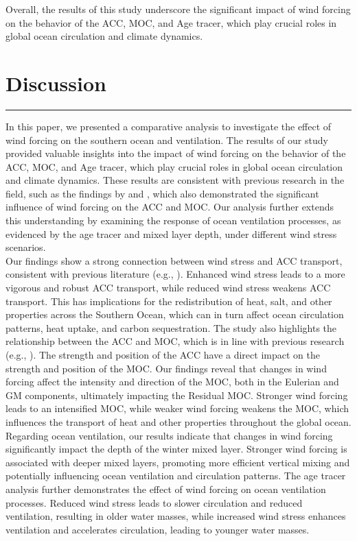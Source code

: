 \documentclass[12pt]{article}
\begin{document}
\noindent Overall, the results of this study underscore the significant impact of wind forcing on the behavior of the ACC, MOC, and Age tracer, which play crucial roles in global ocean circulation and climate dynamics.



\newpage
\section{Discussion}
\rule{\textwidth}{0.4pt}
In this paper, we presented a comparative analysis to investigate the effect of wind forcing on the southern ocean and ventilation.  The results of our study provided valuable insights into the impact of wind forcing on the behavior of the ACC, MOC, and Age tracer, which play crucial roles in global ocean circulation and climate dynamics. These results are consistent with previous research in the field, such as the findings by \cite{meredith2006circumpolar} and \cite{boning2008response}, which also demonstrated the significant influence of wind forcing on the ACC and MOC. Our analysis further extends this understanding by examining the response of ocean ventilation processes, as evidenced by the age tracer and mixed layer depth, under different wind stress scenarios.\\


\noindent Our findings show a strong connection between wind stress and ACC transport, consistent with previous literature (e.g., \citealp{boning2008response}). Enhanced wind stress leads to a more vigorous and robust ACC transport, while reduced wind stress weakens ACC transport. This has implications for the redistribution of heat, salt, and other properties across the Southern Ocean, which can in turn affect ocean circulation patterns, heat uptake, and carbon sequestration. The study also highlights the relationship between the ACC and MOC, which is in line with previous research (e.g., \citealp{marshall2012closure}). The strength and position of the ACC have a direct impact on the strength and position of the MOC. Our findings reveal that changes in wind forcing affect the intensity and direction of the MOC, both in the Eulerian and GM components, ultimately impacting the Residual MOC. Stronger wind forcing leads to an intensified MOC, while weaker wind forcing weakens the MOC, which influences the transport of heat and other properties throughout the global ocean. \\

\noindent Regarding ocean ventilation, our results indicate that changes in wind forcing significantly impact the depth of the winter mixed layer. Stronger wind forcing is associated with deeper mixed layers, promoting more efficient vertical mixing and potentially influencing ocean ventilation and circulation patterns. The age tracer analysis further demonstrates the effect of wind forcing on ocean ventilation processes. Reduced wind stress leads to slower circulation and reduced ventilation, resulting in older water masses, while increased wind stress enhances ventilation and accelerates circulation, leading to younger water masses.\\
\end{document}
